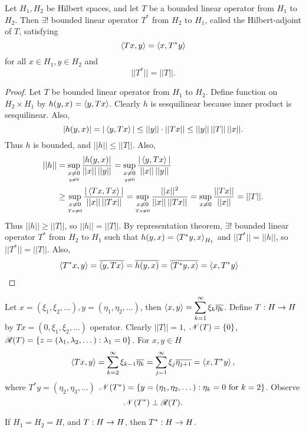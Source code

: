 \documentclass[]{article}
\begin{document}
\begin{recall}
	Let $H_1,H_2$ be Hilbert spaces, and let $T$ be a bounded linear operator from $H_1$ to $H_2$.
	Then $\exists!$ bounded linear operator $T^*$ from $H_2$ to $H_1$, called the Hilbert-adjoint of $T$, satisfying $$\left\langle Tx,y \right\rangle = \left\langle x,T^*y \right\rangle$$ for all $x\in H_1,y\in H_2$ and $$||T^*||=||T||.$$
\end{recall}
\begin{proof}
	Let $T$ be bounded linear operator from $H_1$ to $H_2$.
	Define function on $H_2\times H_1$ by $h(y,x) = \left\langle y,Tx \right\rangle$.
	Clearly $h$ is sesquilinear because inner product is sesquilinear.
	Also, $$|h(y,x)| = |\left\langle y,Tx \right\rangle| \leq ||y||\cdot ||Tx|| \leq ||y||\,||T||\,||x||.$$
	Thus $h$ is bounded, and $||h||\leq||T||$. Also,
	\begin{align*}
		||h|| &= \sup_{\underset{y\neq0}{x\neq0}} \frac{|h(y,x)|}{||x||\,||y||}
			  = \sup_{\underset{y\neq0}{x\neq0}} \frac{|\left\langle y,Tx \right\rangle|}{||x||\,||y||} \\
			  &\geq \sup_{\underset{Tx\neq0}{x\neq0}} \frac{|\left\langle Tx,Tx \right\rangle|}{||x||\,||Tx||}
			  = \sup_{\underset{Tx\neq0}{x\neq0}} \frac{||x||^2}{||x||\,||Tx||}
			  = \sup_{x\neq0} \frac{||Tx||}{||x||} = ||T||.
	\end{align*}
	Thus $||h||\geq||T||$, so $||h||=||T||$.
	By representation theorem, $\exists!$ bounded linear operator $T^*$ from $H_2$ to $H_1$ such that $h(y,x) = \left\langle T^*y,x \right\rangle_{H_1}$ and $||T^*||=||h||$, so $||T^*|| = ||T||$. Also,
	\begin{align*}
		\left\langle T^*x,y \right\rangle &= \overline{\left\langle y,Tx \right\rangle} = \overline{h(y,x)}
		= \overline{\left\langle T^*y,x \right\rangle} = \left\langle x,T^*y \right\rangle
	\end{align*}
\end{proof}

\begin{example}
	[$H_1=H_2=H=\ell^2$] 
	Let $x=(\xi_1,\xi_2,\dots),y=(\eta_1,\eta_2,\dots)$, then $\displaystyle\left\langle x,y \right\rangle = \sum_{k=1}^\infty \xi_k\overline{\eta_k}$.
	Define $T:H\rightarrow H$ by $Tx = (0,\xi_1,\xi_2,\dots)$  operator.
	Clearly $||T||=1$, $\mathscr{N}(T) = \left\{ 0 \right\}$, $\mathscr{R}(T) = \left\{ z=(\lambda_1,\lambda_2,\dots) : \lambda_1=0 \right\}$.
	For $x,y\in H$
	\begin{align*}
		\left\langle Tx,y \right\rangle = \sum_{k=2}^\infty \xi_{k-1}\overline{\eta_k}
		= \sum_{j=1}^\infty \xi_j \overline{\eta_{j+1}}
		= \left\langle x,T^*y \right\rangle,
	\end{align*}
	where $T^*y = (\eta_2,\eta_3,\dots)$ 
	$\mathscr{N}(T^*) = \left\{ y=(\eta_1,\eta_2,\dots) : \eta_k=0\text{ for }k=2 \right\}$.
	Observe $$\mathscr{N}(T^*)\perp\mathscr{R}(T).$$
\end{example}
\begin{note}
	If $H_1=H_2=H$, and $T:H\rightarrow H$, then $T^*:H\rightarrow H$.
\end{note}
\end{document}
